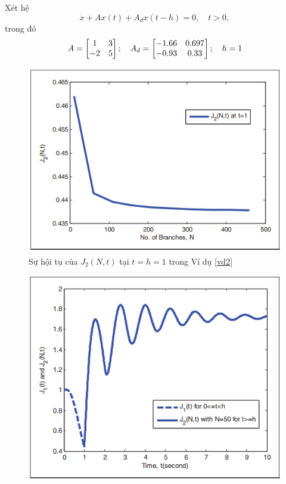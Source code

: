 \begin{vd}\label{vd2}
	Xét hệ
	\begin{equation}\label{45}
		\dot{x} + Ax(t) + A_dx(t-h) =0, \quad t >0 , 
	\end{equation}
trong đó
  \[
  A= \begin{bmatrix} 1&3\\-2&5 \end{bmatrix};\quad A_d = \begin{bmatrix} -1.66&0.697\\ -0.93& 0.33 \end{bmatrix}; \quad h = 1
  \]
\begin{figure}[h!]
	\centering
	\includegraphics[scale= 0.7]{"./Hinh/Hinh16"}
	\caption[Sự hội tụ của $J_2(N,t)$ tại $t = h = 1$ trong Ví dụ \ref{vd2} ]{Sự hội tụ của $J_2(N,t)$ tại $t = h = 1$ trong Ví dụ \ref{vd2}}
	\label{fig:hinh-16}
\end{figure}
\begin{figure}[h!]
	\centering
	\includegraphics[scale= 0.7]{"./Hinh/Hinh17"}

\end{figure}
\end{vd}
